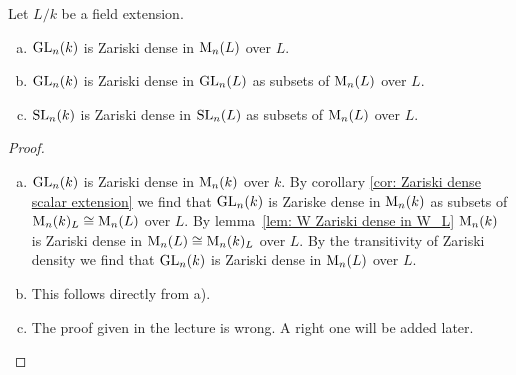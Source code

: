 \begin{prop}
 Let $L/k$ be a field extension.
 \begin{enumerate}[a)]
  \item
  $\operatorname{GL}_n(k)$ is Zariski dense in $\operatorname{M}_n(L)$ over $L$.
  \item
  $\operatorname{GL}_n(k)$ is Zariski dense in $\operatorname{GL}_n(L)$ as subsets of $\operatorname{M}_n(L)$ over $L$.
  \item
  $\operatorname{SL}_n(k)$ is Zariski dense in $\operatorname{SL}_n(L)$ as subsets of $\operatorname{M}_n(L)$ over $L$.
 \end{enumerate}
\end{prop}
\begin{proof}\leavevmode
 \begin{enumerate}[a)]
  \item
  $\operatorname{GL}_n(k)$ is Zariski dense in $\operatorname{M}_n(k)$ over $k$. By corollary \ref{cor: Zariski dense scalar extension} we find that $\operatorname{GL}_n(k)$ is Zariske dense in $\operatorname{M}_n(k)$ as subsets of $\operatorname{M}_n(k)_L \cong \operatorname{M}_n(L)$ over $L$. By \mbox{lemma \ref{lem: W Zariski dense in W_L}} $\operatorname{M}_n(k)$ is Zariski dense in $\operatorname{M}_n(L) \cong \operatorname{M}_n(k)_L$ over $L$. By the transitivity of Zariski density we find that $\operatorname{GL}_n(k)$ is Zariski dense in $\operatorname{M}_n(L)$ over $L$.
  \item
  This follows directly from a).
  \item
  The proof given in the lecture is wrong. A right one will be added later.
  \qedhere
 \end{enumerate}
\end{proof}


































